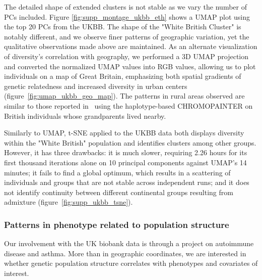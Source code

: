 \documentclass[12pt]{pnas-new}
\begin{document}
The detailed shape of extended clusters is not stable as we vary the number of PCs included. Figure \ref{fig:supp_montage_ukbb_eth} shows a UMAP plot using the top 20 PCs from the UKBB. The shape of the "White British Cluster" is notably different, and we observe finer patterns of geographic variation, yet the qualitative observations made above are maintained. As an alternate visualization of diversity's correlation with geography, we performed a 3D UMAP projection and converted the normalized UMAP values into RGB values, allowing us to plot individuals on a map of Great Britain, emphasizing both spatial gradients of genetic relatedness and increased diversity in urban centers (figure~\ref{fig:umap_ukbb_geo_map}). The patterns in rural areas observed are similar to those reported in~\cite{leslie2015fine} using the haplotype-based CHROMOPAINTER on British individuals whose grandparents lived nearby.  

Similarly to UMAP, t-SNE applied to the UKBB data both displays diversity within the "White British" population and identifies clusters among other groups. However, it has three drawbacks: it is much slower, requiring 2.26 hours for its first thousand iterations alone on 10 principal components against UMAP's 14 minutes; it fails to find a global optimum, which results in a scattering of individuals and groups that are not stable across independent runs; and it does not identify continuity between different continental groups resulting from admixture (figure~\ref{fig:supp_ukbb_tsne}).     

\subsubsection*{Patterns in phenotype related to population structure} Our involvement with the UK biobank data is through a project on autoimmune disease and asthma. More than in geographic coordinates, we are interested in whether genetic population structure correlates with phenotypes and covariates of interest. 
\end{document}
